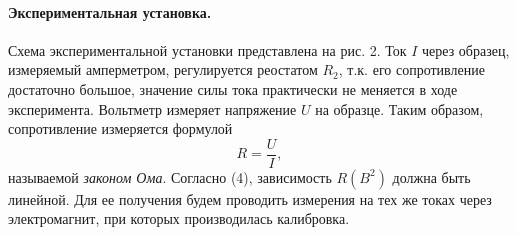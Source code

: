 \documentclass[12pt,a4paper]{article}
\begin{document}
\paragraph{Экспериментальная установка.} Схема экспериментальной установки представлена на рис. 2. Ток $I$ через образец, измеряемый амперметром, регулируется реостатом $R_2$, т.к. его сопротивление достаточно большое, значение силы тока практически не меняется в ходе эксперимента. Вольтметр измеряет напряжение $U$ на образце. Таким образом, сопротивление измеряется формулой
\begin{equation}
R = \frac{U}{I},
\end{equation}
называемой \emph{законом Ома}. Согласно (4), зависимость $R\left(B^2\right)$ должна быть линейной. Для ее получения будем проводить измерения на тех же токах через электромагнит, при которых производилась калибровка.
\end{document}
